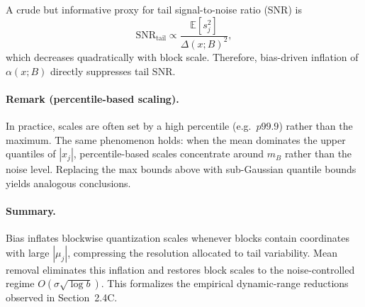 A crude but informative proxy for tail signal-to-noise ratio (SNR) is
\[
\mathrm{SNR}_{\text{tail}} \propto \frac{\mathbb{E}[s_j^2]}{\Delta(x;B)^2},
\]
which decreases quadratically with block scale.
Therefore, bias-driven inflation of $\alpha(x;B)$ directly suppresses tail SNR.

\paragraph{Remark (percentile-based scaling).}
In practice, scales are often set by a high percentile (e.g.\ $p99.9$) rather than
the maximum.
The same phenomenon holds: when the mean dominates the upper quantiles of $|x_j|$,
percentile-based scales concentrate around $m_B$ rather than the noise level.
Replacing the max bounds above with sub-Gaussian quantile bounds yields analogous
conclusions.

\paragraph{Summary.}
Bias inflates blockwise quantization scales whenever blocks contain coordinates
with large $|\mu_j|$, compressing the resolution allocated to tail variability.
Mean removal eliminates this inflation and restores block scales to the
noise-controlled regime $O(\sigma\sqrt{\log b})$.
This formalizes the empirical dynamic-range reductions observed in
Section~2.4C.